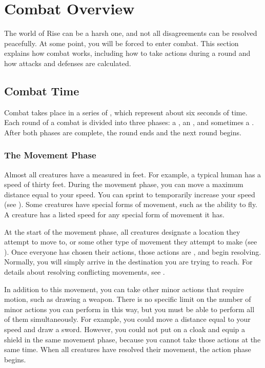 \section{Combat Overview}
    The world of Rise can be a harsh one, and not all disagreements can be resolved peacefully.
    At some point, you will be forced to enter combat.
    This section explains how combat works, including how to take actions during a round and how attacks and defenses are calculated.

    \subsection{Combat Time}
        Combat takes place in a series of , which represent about six seconds of time.
        Each round of a combat is divided into three phases: a , an , and sometimes a .
        After both phases are complete, the round ends and the next round begins.

        \subsubsection{The Movement Phase}\label{The Movement Phase}
            Almost all creatures have a  measured in feet.
            For example, a typical human has a speed of thirty feet.
            During the movement phase, you can move a maximum distance equal to your speed.
            You can sprint to temporarily increase your speed (see ).
            Some creatures have special forms of movement, such as the ability to fly.
            A creature has a listed speed for any special form of movement it has.

            At the start of the movement phase, all creatures designate a location they attempt to move to, or some other type of movement they attempt to make (see ).
            Once everyone has chosen their actions, those actions are , and begin resolving.
            Normally, you will simply arrive in the destination you are trying to reach.
            For details about resolving conflicting movements, see .

            In addition to this movement, you can take other minor actions that require motion, such as drawing a weapon.
            There is no specific limit on the number of minor actions you can perform in this way, but you must be able to perform all of them simultaneously.
            For example, you could move a distance equal to your speed and draw a sword.
            However, you could not put on a cloak and equip a shield in the same movement phase, because you cannot take those actions at the same time.
            When all creatures have resolved their movement, the action phase begins.

